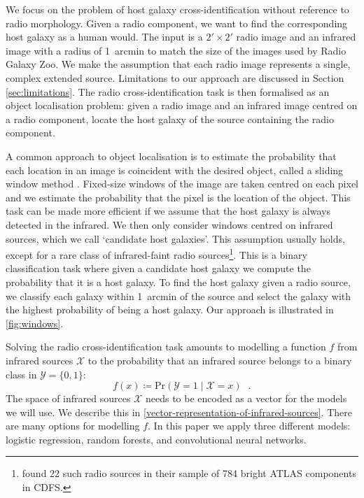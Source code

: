 \documentclass[fleqn,usenatbib,usedcolumn]{mnras}
\begin{document}
    We focus on the problem of host galaxy cross-identification without
    reference to radio morphology. Given a radio component, we want to find
    the corresponding host galaxy as a human would. The input is a $2' \times 2'$ radio image and an infrared image with a
    radius of 1~arcmin to match the size of the
    images used by Radio Galaxy Zoo. We make the assumption that each radio
    image represents a single, complex extended source. Limitations to our approach are discussed in Section \ref{sec:limitations}.
    The radio cross-identification task is then formalised as an object localisation problem: given a radio image
    and an infrared image centred on a radio component, locate the host galaxy
    of the source containing the radio component.

    A common approach to object localisation is to estimate the probability
    that each location in an image is coincident with the desired object, called a sliding window method \citep[e.g.][]{rowley1996facedetection}. 
    Fixed-size windows of the image are taken centred on each pixel and we estimate the probability that the pixel is the location of the object. 
    This task can be made more efficient if we assume that the host galaxy
    is always detected in the infrared. We then only consider windows
    centred on infrared sources, which we call `candidate host galaxies'. This assumption usually holds, except for a
    rare class of infrared-faint radio sources\footnote{\citet{norris06} found 22 such
    radio sources in their sample of 784 bright ATLAS components in CDFS.}.
    This is a binary classification task where given a candidate host galaxy we compute
    the probability that it is a host galaxy. To find the host galaxy given a
    radio source,  we classify each galaxy within 1~arcmin of the source and select
    the galaxy with the highest probability of being a host galaxy. Our approach is illustrated in \autoref{fig:windows}.

    Solving the radio cross-identification task amounts to modelling a function
    $f$ from infrared sources $\mathcal{X}$ to the probability that an infrared
    source belongs to a binary class in $\mathcal{Y} = \{0, 1\}$:
    \begin{equation}
        f(x) \coloneqq \text{Pr}\left(\mathcal{Y} = 1 \mid \mathcal X = x\right)\,\,\,\,.
    \end{equation}
    The space of infrared sources $\mathcal{X}$ needs to be encoded as a vector
    for the models we will use. We describe this in
    \autoref{vector-representation-of-infrared-sources}. There are many options
    for modelling $f$. In this paper we apply three different models: logistic
    regression, random forests, and convolutional neural networks.
\end{document}
